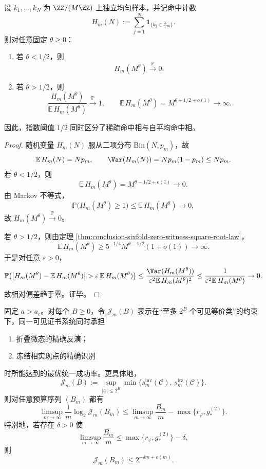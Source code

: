 \begin{proposition}[零见证命中计数的稀疏相与自平均相]\label{prop:conclusion-sixfold-zero-hitcount-sparse-selfaveraging}
设 \(k_1,\dots,k_N\) 为 \(\ZZ/(M\ZZ)\) 上独立均匀样本，并记命中计数
\[
H_m(N):=\sum_{j=1}^{N}\mathbf 1_{\{k_j\in \mathcal Z_m\}}.
\]
则对任意固定 \(\theta\ge 0\)：
\begin{enumerate}
  \item 若 \(\theta<1/2\)，则
  \[
  H_m(M^\theta)\xrightarrow{\mathbb P}0;
  \]
  \item 若 \(\theta>1/2\)，则
  \[
  \frac{H_m(M^\theta)}{\mathbb E\,H_m(M^\theta)}\xrightarrow{\mathbb P}1,
  \qquad
  \mathbb E\,H_m(M^\theta)=M^{\theta-1/2+o(1)}\to\infty.
  \]
\end{enumerate}
因此，指数阈值 \(1/2\) 同时区分了稀疏命中相与自平均命中相。
\end{proposition}

\begin{proof}
随机变量 \(H_m(N)\) 服从二项分布 \(\mathrm{Bin}(N,p_m)\)，故
\[
\mathbb E\,H_m(N)=Np_m,
\qquad
\Var(H_m(N))=Np_m(1-p_m)\le Np_m.
\]
若 \(\theta<1/2\)，则
\[
\mathbb E\,H_m(M^\theta)=M^{\theta-1/2+o(1)}\to 0.
\]
由 Markov 不等式，
\[
\mathbb P\bigl(H_m(M^\theta)\ge 1\bigr)\le \mathbb E\,H_m(M^\theta)\to 0,
\]
故 \(H_m(M^\theta)\xrightarrow{\mathbb P}0\)。

若 \(\theta>1/2\)，则由定理 \ref{thm:conclusion-sixfold-zero-witness-square-root-law}，
\[
\mathbb E\,H_m(M^\theta)\ge 5^{-1/4}M^{\theta-1/2}(1+o(1))\to\infty.
\]
于是对任意 \(\varepsilon>0\)，
\[
\mathbb P\!\left(
\left|H_m(M^\theta)-\mathbb E\,H_m(M^\theta)\right|
>
\varepsilon\,\mathbb E\,H_m(M^\theta)
\right)
\le
\frac{\Var(H_m(M^\theta))}{\varepsilon^2\mathbb E\,H_m(M^\theta)^2}
\le
\frac{1}{\varepsilon^2\mathbb E\,H_m(M^\theta)}
\to 0.
\]
故相对偏差趋于零。证毕。
\end{proof}

\begin{theorem}[同一可见层同时承担两项精确任务时的强逆指数]\label{thm:conclusion-solenoidal-rh-joint-visible-layer-strong-inverse}
固定 \(a>a_{\mathrm c}\)。对每个 \(B\ge 0\)，令 \(\mathcal J_m(B)\) 表示在“至多 \(2^B\) 个可见等价类”的约束下，同一可见证书系统同时承担
\begin{enumerate}
  \item 折叠微态的精确反演；
  \item 冻结相实现点的精确识别
\end{enumerate}
时所能达到的最优统一成功率。更具体地，
\[
\mathcal J_m(B):=
\sup_{|\mathcal C|\le 2^B}
\min\!\bigl\{s_m^{\mathrm{inv}}(\mathcal C),\,s_m^{\mathrm{frz}}(\mathcal C)\bigr\}.
\]
则对任意预算序列 \((B_m)\) 都有
\[
\limsup_{m\to\infty}\frac1m\log_2 \mathcal J_m(B_m)
\le
\limsup_{m\to\infty}\frac{B_m}{m}
-\max\!\bigl\{r_\varphi,g_*^{(2)}\bigr\}.
\]
特别地，若存在 \(\delta>0\) 使
\[
\limsup_{m\to\infty}\frac{B_m}{m}
\le
\max\!\bigl\{r_\varphi,g_*^{(2)}\bigr\}-\delta,
\]
则
\[
\mathcal J_m(B_m)\le 2^{-\delta m+o(m)}.
\]
\end{theorem}

